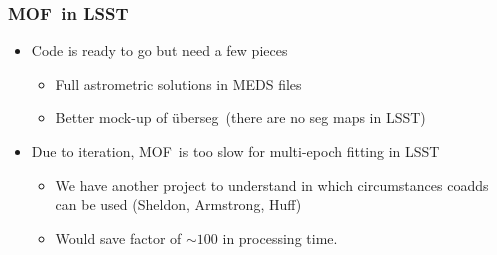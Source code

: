 \documentclass{beamer}
\newcommand{\uberseg}{{\color{lightsteelblue} {\"u}berseg}}
\newcommand{\MOF}{{\color{brightred}MOF}}
\begin{document}
\frame
{
    \frametitle{\MOF\ in LSST}


    \begin{itemize}

        \item Code is ready to go but need a few pieces
            \begin{itemize}
                \item Full astrometric solutions in MEDS files
                \item Better mock-up of \uberseg\ (there are no seg maps in LSST)
            \end{itemize}

        \item Due to iteration, \MOF\ is too slow for multi-epoch fitting in LSST
            \begin{itemize}
                \item We have another project to understand in which circumstances
                    coadds can be used (Sheldon, Armstrong, Huff)
                \item Would save factor of $\sim 100$ in processing time.
            \end{itemize}

    \end{itemize}
}
\end{document}
